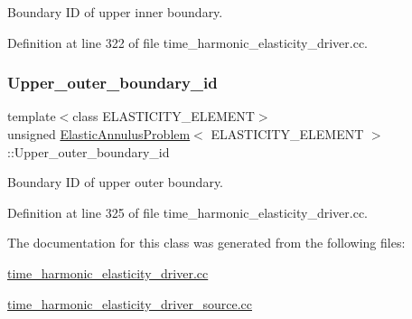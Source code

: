 Boundary ID of upper inner boundary. 



Definition at line 322 of file time\+\_\+harmonic\+\_\+elasticity\+\_\+driver.\+cc.

\mbox{\label{classElasticAnnulusProblem_a30ffabbfca663989fe1e787ff7ec21ba}} 
\subsubsection{\texorpdfstring{Upper\+\_\+outer\+\_\+boundary\+\_\+id}{Upper\_outer\_boundary\_id}}
{\footnotesize\ttfamily template$<$class E\+L\+A\+S\+T\+I\+C\+I\+T\+Y\+\_\+\+E\+L\+E\+M\+E\+NT$>$ \\
unsigned \hyperlink{classElasticAnnulusProblem}{Elastic\+Annulus\+Problem}$<$ E\+L\+A\+S\+T\+I\+C\+I\+T\+Y\+\_\+\+E\+L\+E\+M\+E\+NT $>$\+::Upper\+\_\+outer\+\_\+boundary\+\_\+id\hspace{0.3cm}{\ttfamily [private]}}



Boundary ID of upper outer boundary. 



Definition at line 325 of file time\+\_\+harmonic\+\_\+elasticity\+\_\+driver.\+cc.



The documentation for this class was generated from the following files\+:\begin{DoxyCompactItemize}
\item 
\hyperlink{time__harmonic__elasticity__driver_8cc}{time\+\_\+harmonic\+\_\+elasticity\+\_\+driver.\+cc}\item 
\hyperlink{time__harmonic__elasticity__driver__source_8cc}{time\+\_\+harmonic\+\_\+elasticity\+\_\+driver\+\_\+source.\+cc}\end{DoxyCompactItemize}
